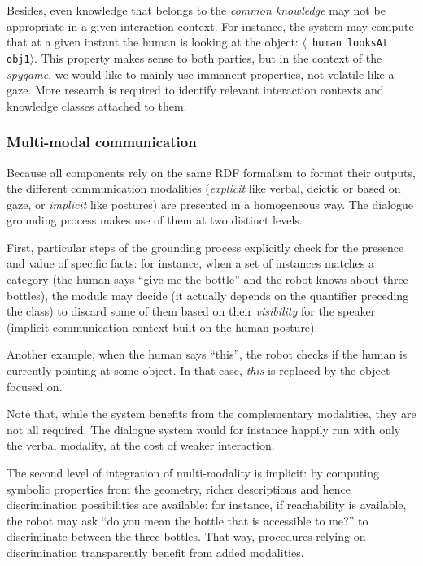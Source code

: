 \documentclass[preprint,5p]{elsarticle}
\newcommand{\stmt}[1]{{\footnotesize \tt $\langle$ #1\relax$\rangle$}}
\begin{document}
Besides, even knowledge that belongs to the \emph{common knowledge} may not be
appropriate in a given interaction context. For instance, the system may
compute that at a given instant the human is looking at the object: \stmt{human
looksAt obj1}. This property makes sense to both parties, but in the context of
the \emph{spygame}, we would like to mainly use immanent properties, not
volatile like a gaze. More research is required to identify relevant
interaction contexts and knowledge classes attached to them.

\subsubsection{Multi-modal communication}

Because all components rely on the same RDF formalism to format their outputs,
the different communication modalities (\emph{explicit} like verbal, deictic or
based on gaze, or \emph{implicit} like postures) are presented in a homogeneous
way. The dialogue grounding process makes use of them at two distinct levels.

First, particular steps of the grounding process explicitly check for the
presence and value of specific facts: for instance, when a set of instances
matches a category (the human says ``give me the bottle'' and the robot knows
about three bottles), the module may decide (it actually depends on the
quantifier preceding the class) to discard some of them based on their
\emph{visibility} for the speaker (implicit communication context built on the
human posture).

Another example, when the human says ``this'', the robot checks if the human is
currently pointing at some object. In that case, \emph{this} is replaced by the
object focused on.

Note that, while the system benefits from the complementary modalities, they
are not all required. The dialogue system would for instance happily run with
only the verbal modality, at the cost of weaker interaction.

The second level of integration of multi-modality is implicit: by computing
symbolic properties from the geometry, richer descriptions and hence
discrimination possibilities are available: for instance, if reachability is
available, the robot may ask ``do you mean the bottle that is accessible to
me?'' to discriminate between the three bottles. That way, procedures relying
on discrimination transparently benefit from added modalities.
\end{document}
